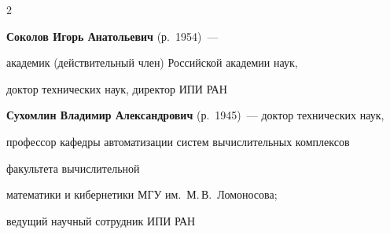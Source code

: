 \begin{multicols}{2}
\vspace*{6pt}



\noindent %

\textbf{Соколов Игорь Анатольевич} (р.\ 1954)~---

академик (действительный член) Российской академии наук,

доктор технических наук, директор ИПИ РАН













\vspace*{9pt}



\noindent

\textbf{Сухомлин Владимир Александрович} (р.\ 1945)~--- доктор технических наук,

профессор кафедры автоматизации сис\-тем вычислительных комплексов\linebreak

факультета вычислительной

математики и кибернетики МГУ им.\ М.\,В.~Ломоносова;

ведущий научный сотрудник ИПИ РАН





\vspace*{9pt}













\end{multicols}
